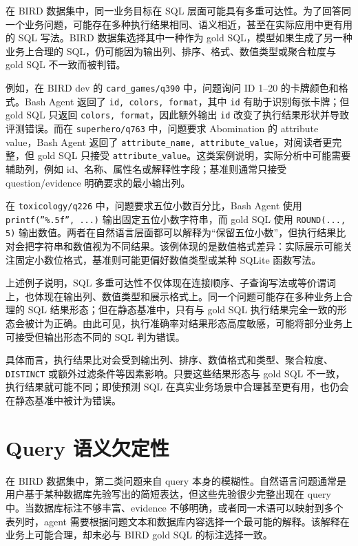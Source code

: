 \documentclass[
    bachelor,
    pdflinks,
]{xjtuthesis}
\begin{document}
在 BIRD 数据集中，同一业务目标在 SQL 层面可能具有多重可达性。为了回答同一个业务问题，可能存在多种执行结果相同、语义相近，甚至在实际应用中更有用的 SQL 写法。BIRD 数据集选择其中一种作为 gold SQL，模型如果生成了另一种业务上合理的 SQL，仍可能因为输出列、排序、格式、数值类型或聚合粒度与 gold SQL 不一致而被判错。

例如，在 BIRD dev 的 \texttt{card\_games/q390} 中，问题询问 ID 1--20 的卡牌颜色和格式。Bash Agent 返回了 \texttt{id, colors, format}，其中 \texttt{id} 有助于识别每张卡牌；但 gold SQL 只返回 \texttt{colors, format}，因此额外输出 \texttt{id} 改变了执行结果形状并导致评测错误。而在 \texttt{superhero/q763} 中，问题要求 Abomination 的 attribute value，Bash Agent 返回了 \texttt{attribute\_name, attribute\_value}，对阅读者更完整，但 gold SQL 只接受 \texttt{attribute\_value}。这类案例说明，实际分析中可能需要辅助列，例如 id、名称、属性名或解释性字段；基准则通常只接受 question/evidence 明确要求的最小输出列。

在 \texttt{toxicology/q226} 中，问题要求五位小数百分比，Bash Agent 使用 \texttt{printf(''\%.5f'', ...)} 输出固定五位小数字符串，而 gold SQL 使用 \texttt{ROUND(..., 5)} 输出数值。两者在自然语言层面都可以解释为“保留五位小数”，但执行结果比对会把字符串和数值视为不同结果。该例体现的是数值格式差异：实际展示可能关注固定小数位格式，基准则可能更偏好数值类型或某种 SQLite 函数写法。

上述例子说明，SQL 多重可达性不仅体现在连接顺序、子查询写法或等价谓词上，也体现在输出列、数值类型和展示格式上。同一个问题可能存在多种业务上合理的 SQL 结果形态；但在静态基准中，只有与 gold SQL 执行结果完全一致的形态会被计为正确。由此可见，执行准确率对结果形态高度敏感，可能将部分业务上可接受但输出形态不同的 SQL 判为错误。

具体而言，执行结果比对会受到输出列、排序、数值格式和类型、聚合粒度、\texttt{DISTINCT} 或额外过滤条件等因素影响。只要这些结果形态与 gold SQL 不一致，执行结果就可能不同；即使预测 SQL 在真实业务场景中合理甚至更有用，也仍会在静态基准中被计为错误。

\section{Query 语义欠定性}

在 BIRD 数据集中，第二类问题来自 query 本身的模糊性。自然语言问题通常是用户基于某种数据库先验写出的简短表达，但这些先验很少完整出现在 query 中。当数据库标注不够丰富、evidence 不够明确，或者同一术语可以映射到多个表列时，agent 需要根据问题文本和数据库内容选择一个最可能的解释。该解释在业务上可能合理，却未必与 BIRD gold SQL 的标注选择一致。
\end{document}
